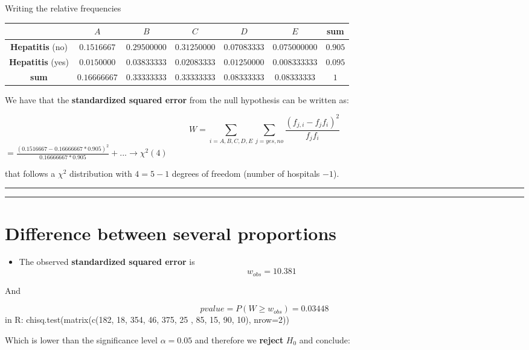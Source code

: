 \documentclass[
]{book}
\providecommand{\tightlist}{%
  \setlength{\itemsep}{0pt}\setlength{\parskip}{0pt}}
\begin{document}
Writing the relative frequencies

\begin{longtable}[]{@{}ccccccc@{}}
\toprule
& \(A\) & \(B\) & \(C\) & \(D\) & \(E\) & sum \\
\midrule
\endhead
\textbf{Hepatitis} (no) & \(0.1516667\) & \(0.29500000\) & \(0.31250000\) & \(0.07083333\) & \(0.075000000\) & \(0.905\) \\
\textbf{Hepatitis} (yes) & \(0.0150000\) & \(0.03833333\) & \(0.02083333\) & \(0.01250000\) & \(0.008333333\) & \(0.095\) \\
\textbf{sum} & \(0.16666667\) & \(0.33333333\) & \(0.33333333\) & \(0.08333333\) & \(0.08333333\) & \(1\) \\
\bottomrule
\end{longtable}

We have that the \textbf{standardized squared error} from the null hypothesis can be written as:

\[W= \sum_{i=A,B,C,D,E} \sum_{j=yes,no} \frac{(f_{j,i}-f_{j}f_{i})^2}{f_{j}f_{i}}\]
\(= \frac{(0.1516667 - 0.16666667*0.905)^2}{0.16666667*0.905} + ... \rightarrow \chi^2(4)\)

that follows a \(\chi^2\) distribution with \(4=5-1\) degrees of freedom (number of hospitals \(-1\)).

\begin{center}\rule{0.5\linewidth}{0.5pt}\end{center}

\begin{center}\rule{0.5\linewidth}{0.5pt}\end{center}

\hypertarget{difference-between-several-proportions-2}{%
\section{Difference between several proportions}\label{difference-between-several-proportions-2}}

\begin{itemize}
\tightlist
\item
  The observed \textbf{standardized squared error} is
  \[w_{obs}=10.381\]
\end{itemize}

And

\[pvalue=P(W \geq w_{obs}) = 0.03448\]
in R:
chisq.test(matrix(c(182, 18, 354, 46, 375, 25 , 85, 15, 90, 10), nrow=2))

Which is lower than the significance level \(\alpha=0.05\) and therefore we \textbf{reject} \(H_0\) and conclude:
\end{document}

